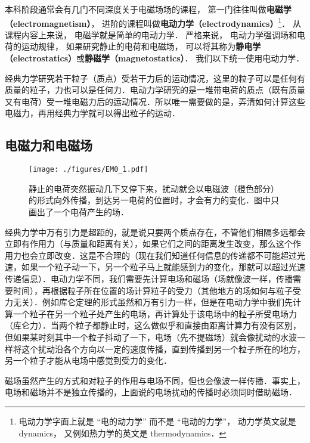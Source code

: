 

本科阶段通常会有几门不同深度关于电磁场场的课程， 第一门往往叫做\textbf{电磁学（electromagnetism）}， 进阶的课程叫做\textbf{电动力学（electrodynamics）}\footnote{电动力学字面上就是 “电的动力学” 而不是 “电动的力学”， 动力学英文就是 dynamics， 又例如热力学的英文是 thermodynamics．}． 从课程内容上来说， 电磁学就是简单的电动力学． 严格来说， 电动力学强调场和电荷的运动规律， 如果研究静止的电荷和电磁场， 可以将其称为\textbf{静电学（electrostatics）}或\textbf{静磁学（magnetostatics）}． 我们以下统一使用电动力学．

经典力学研究若干粒子（质点）受若干力后的运动情况，这里的粒子可以是任何有质量的粒子，力也可以是任何力．电动力学研究的是一堆带电荷的质点（既有质量又有电荷）受一堆电磁力后的运动情况．所以唯一需要做的是，弄清如何计算这些电磁力，再用经典力学就可以得出粒子的运动．

\subsection{电磁力和电磁场}

\begin{figure}[ht]
\centering
\texttt{[image: ./figures/EM0\_1.pdf]}
\caption{静止的电荷突然振动几下又停下来，扰动就会以电磁波（橙色部分）的形式向外传播，到达另一电荷的位置时，才会有力的变化．图中只画出了一个电荷产生的场．} \label{EM0_fig1}
\end{figure}

经典力学中万有引力是超距的，就是说只要两个质点存在，不管他们相隔多远都会立即有作用力（与质量和距离有关），如果它们之间的距离发生改变，那么这个作用力也会立即改变．这是不合理的（现在我们知道任何信息的传递都不可能超过光速，如果一个粒子动一下，另一个粒子马上就能感到力的变化，那就可以超过光速传递信息）．电动力学不同，我们需要先计算电场和磁场（场就像波一样，传播需要时间），再根据粒子所在位置的场计算粒子的受力（其他地方的场如何与粒子受力无关）．例如库仑定理的形式虽然和万有引力一样，但是在电动力学中我们先计算一个粒子在另一个粒子处产生的电场，再计算处于该电场中的粒子所受电场力（库仑力）．当两个粒子都静止时，这么做似乎和直接由距离计算力有没有区别，但如果某时刻其中一个粒子抖动了一下，电场（先不提磁场）就会像扰动的水波一样将这个扰动沿各个方向以一定的速度传播，直到传播到另一个粒子所在的地方，另一个粒子才能从电场中感觉到受力的变化．

磁场虽然产生的方式和对粒子的作用与电场不同，但也会像波一样传播．事实上，电场和磁场并不是独立传播的，上面说的电场扰动的传播时必须同时借助磁场．

